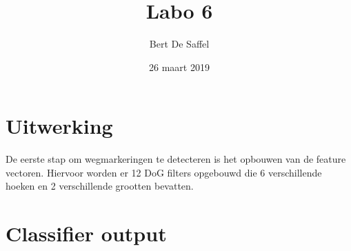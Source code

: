 \documentclass{article}
\begin{document}
	\title{Labo 6}
	\author{Bert De Saffel}
	\date{26 maart 2019}
	\maketitle
	
\section{Uitwerking}
De eerste stap om wegmarkeringen te detecteren is het opbouwen van de feature vectoren. Hiervoor worden er 12 DoG filters opgebouwd die 6 verschillende hoeken en 2 verschillende grootten bevatten.




\section{Classifier output}
	

	
\end{document}
